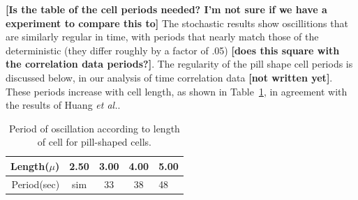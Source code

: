 \documentclass[letterpaper,twocolumn,amsmath,amssymb,pre]{revtex4-1}
\newcommand{\red}[1]{{\bf \color{red} #1}}
\newcommand{\fixme}[1]{\red{[#1]}}
\begin{document}
\fixme{Is the table of the cell periods needed? I'm not sure if we
  have a experiment to compare this to} The stochastic results show
oscillitions that are similarly regular in time, with periods that
nearly match those of the deterministic (they differ roughly by a
factor of .05) \fixme{does this square with the correlation data
  periods?}. The regularity of the pill shape cell periods is
discussed below, in our analysis of time correlation data \fixme{not
  written yet}.  These periods increase with cell length, as shown in
Table~\ref{tab:pill-periods}, in agreement with the results of Huang
\emph{et al.}.


\begin{table}
  \begin{tabular}{|r|c|c|c|l|}
    \hline Length($\mu$) & 2.50 & 3.00 & 4.00 & 5.00\\ \hline
    Period(sec) & sim & 33 & 38 & 48 \\ \cline{2-2} \hline
  \end{tabular}
  \caption{Period of oscillation according to length of cell for
    pill-shaped cells.}\label{tab:pill-periods}
\end{table}
\end{document}
